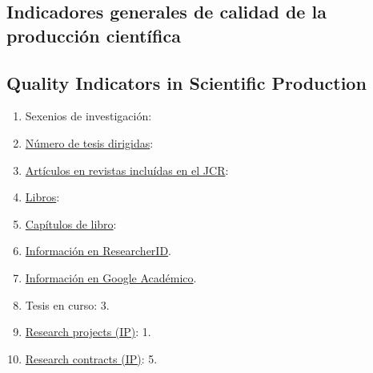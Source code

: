 \documentclass[a4paper]{article}
\def\english{1}
\begin{document}
\ifx\english\undefined
\subsection{Indicadores generales de calidad de la producción científica}
\else
\subsection{Quality Indicators in Scientific Production}
\fi

\ifx\english\undefined
\begin{enumerate}
\item Sexenios de investigación: 
\item \href{https://vicente-gonzalez-ruiz.github.io/ridiculum/#x1-180009}{Número de tesis dirigidas}: 
\item \href{https://vicente-gonzalez-ruiz.github.io/ridiculum/#x1-20001}{Artículos en revistas incluídas en el JCR}: 
\item \href{https://vicente-gonzalez-ruiz.github.io/ridiculum/#x1-60003}{Libros}: 
\item \href{https://vicente-gonzalez-ruiz.github.io/ridiculum/#x1-80004}{Capítulos de libro}: 
\item \href{http://www.researcherid.com/rid/\ResearcherID}{Información en ResearcherID}.
\item \href{https://scholar.google.es/citations?hl=es&user=\GoogleUser}{Información en Google Académico}. \\
\item Tesis en curso: 3.
\item \href{https://vicente-gonzalez-ruiz.github.io/ridiculum/#x1-100005}{Research projects (IP)}:  1. \\
\item \href{https://vicente-gonzalez-ruiz.github.io/ridiculum/#x1-160008}{Research contracts (IP)}:  5.
\end{enumerate}
\else
\end{document}
